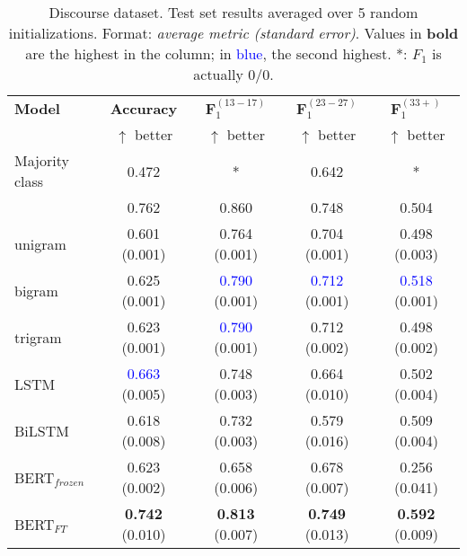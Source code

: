 \begin{table*}[h]
    \centering
    \begin{tabular}{l c c c c}
    \toprule
    \textbf{Model} & \textbf{Accuracy} & $\boldsymbol{F}_1^{(13-17)}$ & $\boldsymbol{F}_1^{(23-27)}$ & $\boldsymbol{F}_1^{(33+)}$\\
     & $\uparrow$ better & $\uparrow$ better & $\uparrow$ better & $\uparrow$ better\\
    \midrule
    Majority class
    & 0.472
    & * & 0.642
    & *\\
    \citet{schler2006effects} & 0.762 & 0.860 & 0.748 & 0.504 \\
    \midrule
    unigram & 0.601 (0.001) & 0.764 (0.001) & 0.704 (0.001) & 0.498 (0.003)\\
    bigram & 0.625 (0.001) & \textcolor{blue}{0.790} (0.001) & \textcolor{blue}{0.712} (0.001) & \textcolor{blue}{0.518} (0.001)\\
    trigram & 0.623 (0.001) & \textcolor{blue}{0.790} (0.001) & 0.712 (0.002) & 0.498 (0.002)\\
    \midrule
    LSTM & \textcolor{blue}{0.663} (0.005) & 0.748 (0.003) & 0.664 (0.010) & 0.502 (0.004) \\
    BiLSTM & 0.618 (0.008) & 0.732 (0.003) & 0.579 (0.016) & 0.509 (0.004)\\
    \midrule
    BERT$_{frozen}$
    & 0.623 (0.002) & 0.658 (0.006) & 0.678 (0.007) & 0.256 (0.041)\\
    BERT$_{FT}$
    & \textbf{0.742} (0.010) & \textbf{0.813} (0.007) & \textbf{0.749} (0.013) & \textbf{0.592} (0.009)\\
    \bottomrule
    \end{tabular}
    \caption{Discourse dataset.  Test set results averaged over 5 random initializations. Format: \textit{average metric (standard error)}. Values in \textbf{bold} are the highest in the column; in \textcolor{blue}{blue}, the second highest. *: $F_1$ is actually $0/0$.}
    \label{tab:blog_classification}
\end{table*}

